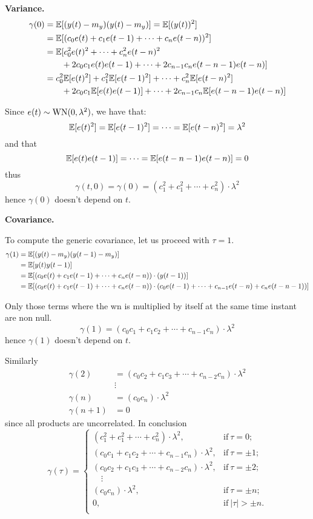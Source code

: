 \textbf{Variance.}
\begin{align*}
	\gamma (0)&=\mathbb{E}[(y(t)-m_{y})(y(t)-m_{y})]=\mathbb{E}[(y(t))^2]\\
	&=\mathbb{E}[(c_{0} e(t)+c_{1} e(t-1)+\cdots+c_{n} e(t-n))^{2}]\\
	&=\mathbb{E}[c_{0}^{2} e(t)^{2}+\cdots+c_{n}^{2} e(t-n)^{2}\\
	&\qquad+2 c_{0} c_{1} e(t) e(t-1)+\cdots+2 c_{n-1} c_{n} e(t-n-1) e(t-n)]\\
	&=c_{0}^{2} \mathbb{E}[e(t)^{2}]+c_{1}^{2} \mathbb{E}[e(t-1)^{2}]+\cdots+c_{n}^{2} \mathbb{E}[e(t-n)^{2}]\\
	&\qquad+2 c_{0} c_{1} \mathbb{E}[e(t) e(t-1)]+\cdots+2 c_{n-1} c_{n} \mathbb{E}[e(t-n-1) e(t-n)]
\end{align*}

Since $e(t) \sim \operatorname{WN}(0, \lambda^{2})$, we have that:
$$
\mathbb{E}[e(t)^{2}]=\mathbb{E}[e(t-1)^{2}]=\cdots=\mathbb{E}[e(t-n)^{2}]=\lambda^{2}
$$
and that
$$
\mathbb{E}[e(t) e(t-1)]=\cdots=\mathbb{E}[e(t-n-1) e(t-n)]=0
$$
thus
\[
	\boxed{\gamma (t,0)=\gamma (0)=(c_{1}^2 +c_{1}^2 +\cdots+c_{n}^2 )\cdot\lambda^2}
\]
hence $\gamma (0)$ doesn't depend on $t$.

\textbf{Covariance.}

To compute the generic covariance, let us proceed with $\tau =1$.
\begin{align*}
	\gamma(1)&=\mathbb{E}[(y(t)-m_{y})(y(t-1)-m_{y})]\\
	&=\mathbb{E}[y(t) y(t-1)]\\
	&=\mathbb{E}[(c_{0} e(t)+c_{1} e(t-1)+\cdots+c_{n} e(t-n))\cdot (y(t-1))]\\
	&=\mathbb{E}[(c_{0} e(t)+c_{1} e(t-1)+\cdots+c_{n} e(t-n))\cdot (c_{0} e(t-1)+\cdots+c_{n-1} e(t-n)+c_{n} e(t-n-1))]
\end{align*}

Only those terms where the \gls{wn} is multiplied by itself at the same time instant are non null.
\[
	\gamma (1)=(c_{0}c_{1}+c_{1}c_{2}+\cdots+c_{n-1}c_{n})\cdot\lambda^2
\]
hence $\gamma (1)$ doesn't depend on $t$.

Similarly
\begin{align*}
	\gamma (2) &= (c_{0}c_{2}+c_{1}c_{3}+\cdots+c_{n-2}c_{n})\cdot\lambda^2\\
	&\vdots\\
	\gamma (n) &= (c_{0}c_{n})\cdot\lambda^2\\
	\gamma (n+1) &= 0
\end{align*}
since all products are uncorrelated. In conclusion
\[
	\boxed{
		\gamma (\tau )=\begin{cases}
			(c_{1}^2 +c_{1}^2 +\cdots+c_{n}^2 )\cdot\lambda^2, & \text{if}\ \tau =0;\\
			(c_{0}c_{1}+c_{1}c_{2}+\cdots+c_{n-1}c_{n})\cdot\lambda^2, & \text{if}\ \tau =\pm 1;\\
			(c_{0}c_{2}+c_{1}c_{3}+\cdots+c_{n-2}c_{n})\cdot\lambda^2, & \text{if}\ \tau =\pm 2;\\
			\quad\vdots\\
			(c_{0}c_{n})\cdot\lambda^2, & \text{if}\ \tau =\pm n;\\
			0, & \text{if}\ |\tau| > \pm n.\\
		\end{cases}
	}
\]
